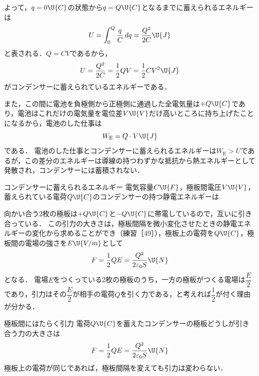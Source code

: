 よって，$q=0\U{C}$の状態から$q=Q\U{C}$となるまでに蓄えられるエネルギーは
\[U=\int_0^Q\frac{q}{C}\,dq=\frac{Q^2}{2C}\U{J}\]
と表される．$Q=CV$であるから，
\[U=\frac{Q^2}{2C}=\frac{1}{2}QV=\frac{1}{2}CV^2\U{J}\]
がコンデンサーに蓄えられているエネルギーである．

また，この間に電池を負極側から正極側に通過した全電気量は$+Q\U{C}$であり，電池はこれだけの電気量を電位差$V\U{V}$だけ高いところに持ち上げたことになるから，電池のした仕事は
\[W_{\mathrm{E}}=Q\cdot V\U{J}\]
である．
電池のした仕事とコンデンサーに蓄えられるエネルギーは$W_{\mathrm{E}}>U$であるが，この差分のエネルギーは{\gtfamily 導線の持つわずかな抵抗から熱エネルギーとして発散され}，コンデンサーには蓄積されない．

\bsNeed{32mm}
\begin{matome}{コンデンサーに蓄えられるエネルギー}
 \hspace{3mm} 電気容量$C\U{F}$，極板間電圧$V\U{V}$，蓄えられている電荷$Q\U{C}$のコンデンサーの持つ静電エネルギーは
\end{matome}

向かい合う2枚の極板は$+Q\U{C}$と$-Q\U{C}$に帯電しているので，互いに引き合っている．
この引力の大きさは，極板間隔を微小変化させたときの静電エネルギーの変化から求めることができ（練習［49］），極板上の電荷を$Q\U{C}$，極板間の電場の強さを$E\U{V/m}$として
\[F=\frac{1}{2}QE=\frac{Q^2}{2\varepsilon_0 S}\U{N}\]
となる．
電場$E$をつくっている2枚の極板のうち，一方の極板がつくる電場は$\dfrac{E}{2}$であり，引力はその$\dfrac{E}{2}$が相手の電荷$Q$を引く力である，と考えれば$\dfrac{1}{2}$が付く理由が分かる．

\bsNeed{30mm}
\begin{matome}{極板間にはたらく引力}
 \hspace{3mm} 電荷$Q\U{C}$を蓄えたコンデンサーの極板どうしが引き合う力の大きさは
 \[F=\frac{1}{2}QE=\frac{Q^2}{2\varepsilon_0 S}\U{N}\]
 \hspace{3mm} 極板上の電荷が同じであれば，{\gtfamily 極板間隔を変えても引力は変わらない}．
\end{matome}

